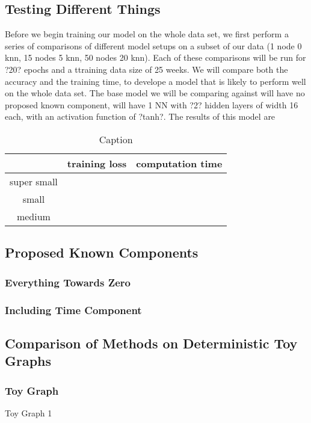 \documentclass[12pt]{article}
\begin{document}
    \subsection{Testing Different Things}
        Before we begin training our model on the whole data set, we first perform a series of comparisons of different model setups on a subset of our data (1 node 0 knn, 15 nodes 5 knn, 50 nodes 20 knn). Each of these comparisons will be run for ?20? epochs and a ttraining data size of 25 weeks. We will compare both the accuracy and the training time, to develope a model that is likely to perform well on the whole data set. The base model we will be comparing against will have no proposed known component, will have 1 NN with ?2? hidden layers of width 16 each, with an activation function of ?tanh?. The results of this model are
        \begin{table}[]
            \centering
            \begin{tabular}{c|c|c}
                 & training loss & computation time \\
                 \hline
                 super small &  \\
                 small & \\
                 medium &
            \end{tabular}
            \caption{Caption}
            \label{tab:my_label}
        \end{table}
        
    \subsection{Proposed Known Components}
        \subsubsection{Everything Towards Zero} 
        \subsubsection{Including Time Component}
    \subsection{Comparison of Methods on Deterministic Toy Graphs}
        \subsubsection{Toy Graph}
            Toy Graph 1\\
            
\end{document}
